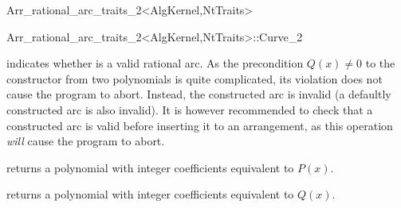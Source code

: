 \begin{ccRefClass}{Arr_rational_arc_traits_2<AlgKernel,NtTraits>}
\begin{ccClass}{Arr_rational_arc_traits_2<AlgKernel,NtTraits>::Curve_2}
\ccAccessFunctions

  {indicates whether \ccVar{} is a valid rational arc. As the precondition 
   $Q(x) \neq 0$ to the constructor from two polynomials is quite complicated,
   its violation does not cause the program to abort. Instead, the constructed
   arc is invalid (a defaultly constructed arc is also invalid).
   It is however recommended to check that a constructed arc is valid before
   inserting it to an arrangement, as this operation {\sl will} cause the
   program to abort.}

  {returns a polynomial with integer coefficients equivalent to $P(x)$.}

  {returns a polynomial with integer coefficients equivalent to $Q(x)$.}


\end{ccClass}

\end{ccRefClass}
\ccRefPageEnd
